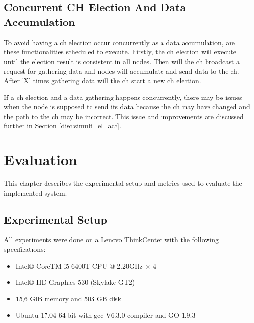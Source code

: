\documentclass[USenglish]{uit-thesis}
\begin{document}
\newpage

\section{Concurrent CH Election And Data Accumulation}
To avoid having a \gls{ch} election occur concurrently as a data accumulation, are these functionalities scheduled to execute.
Firstly, the \gls{ch} election will execute until the election result is consistent in all nodes. Then will the \gls{ch} broadcast a request for gathering data and nodes will accumulate and send data to the \gls{ch}. After 'X' times gathering data will the \gls{ch} start a new \gls{ch} election. 

If a \gls{ch} election and a data gathering happens concurrently, there may be issues when the node is supposed to send its data because the \gls{ch} may have changed and the path to the \gls{ch} may be incorrect. This issue and improvements are discussed further in Section \ref{disc:simult_el_acc}.




\chapter{Evaluation}
This chapter describes the experimental setup and metrics used to evaluate the implemented system.

\section{Experimental Setup}
All experiments were done on a Lenovo ThinkCenter with the following specifications:

\begin{itemize} 
\item Intel® CoreTM i5-6400T CPU @ 2.20GHz × 4
\item Intel® HD Graphics 530 (Skylake GT2)
\item 15,6 GiB memory and 503 GB disk
\item Ubuntu 17.04 64-bit with gcc V6.3.0 compiler and GO 1.9.3
\end{itemize}
\end{document}
